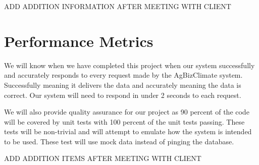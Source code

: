 \documentclass[letterpaper,10pt]{article}
\begin{document}
		ADD ADDITION INFORMATION AFTER MEETING WITH CLIENT

\section {Performance Metrics}
		
		We will know when we have completed this project when our system successfully and accurately responds to every request made by the AgBizClimate system. Successfully meaning it delivers the data and accurately meaning the data is correct. Our system will need to respond in under 2 seconds to each request.
		
		We will also provide quality assurance for our project as 90 percent of the code will be covered by unit tests with 100 percent of the unit tests passing. These tests will be non-trivial and will attempt to emulate how the system is intended to be used. These test will use mock data instead of pinging the database.
		
		ADD ADDITION ITEMS AFTER MEETING WITH CLIENT
\end{document}
